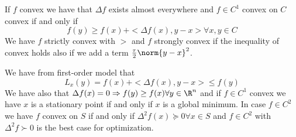 If $f$ convex we have that $\Delta f$ exists almost everywhere and $f \in C^1$ convex on $C$ convex if and only if
\[ f(y) \geq f(x) + <\Delta f(x), y - x> \forall x,y \in C \]
We have $f$ strictly convex with $>$ and $f$ strongly convex if the inequality of convex holds
also if we add a term $\frac{\tau}{2} \norm{y-x}^2$.

We have from first-order model that 
\[ L_x(y) = f(x) + <\Delta f(x), y - x> \leq f(y) \]
We have also that $\Delta f(x) = 0 \Rightarrow f(y) \geq f(x) \forall y \in \R^n$ and if $f \in C^1$ convex we 
have $x$ is a stationary point if and only if $x$ is a global minimum.\newline
In case $f \in C^2$ we have $f$ convex on $S$ if and only if $\Delta^2 f(x) \succeq 0 \forall x \in S$ and 
$f \in C^2$ with $\Delta^2 f \succ 0$ is the best case for optimization.
